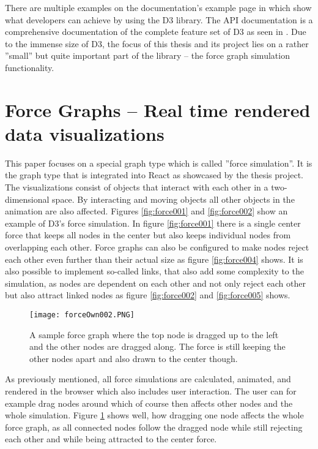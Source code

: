 \begin{emergency}{1em}
There are multiple examples on the documentation's example page in \cite{D3Examples} which show what developers can achieve by using the D3 library. The API documentation is a comprehensive documentation of the complete feature set of D3 as seen in \cite[\mbox{/d3/blob/master/API.md}]{D3Github}. Due to the immense size of D3, the focus of this thesis and its project lies on a rather ''small'' but quite important part of the library -- the force graph simulation functionality.
\end{emergency}

\section{Force Graphs -- Real time rendered data visualizations}

This paper focuses on a special graph type which is called ''force simulation''. It is the graph type that is integrated into React as showcased by the thesis project. The visualizations consist of objects that interact with each other in a two-dimensional space. By interacting and moving objects all other objects in the animation are also affected. Figures \ref{fig:force001} and \ref{fig:force002} show an example of D3's force simulation. In figure \ref{fig:force001} there is a single center force that keeps all nodes in the center but also keeps individual nodes from overlapping each other. Force graphs can also be configured to make nodes reject each other even further than their actual size as figure \ref{fig:force004} shows. It is also possible to implement so-called links, that also add some complexity to the simulation, as nodes are dependent on each other and not only reject each other but also attract linked nodes as figure \ref{fig:force002} and \ref{fig:force005} shows.

\begin{figure}
    \centering
    \texttt{[image: forceOwn002.PNG]}
    \caption{A sample force graph where the top node is dragged up to the left and the other nodes are dragged along. The force is still keeping the other nodes apart and also drawn to the center though.}
    \label{fig:force003}
  \end{figure}

As previously mentioned, all force simulations are calculated, animated, and rendered in the browser which also includes user interaction. The user can for example drag nodes around which of course then affects other nodes and the whole simulation. Figure \ref{fig:force003} shows well, how dragging one node affects the whole force graph, as all connected nodes follow the dragged node while still rejecting each other and while being attracted to the center force.


